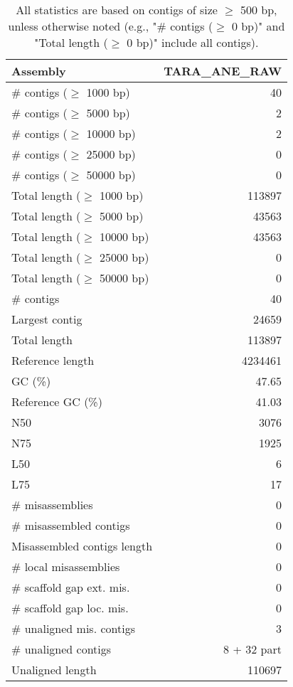 \documentclass[12pt,a4paper]{article}
\begin{document}
\begin{table}[ht]
\begin{center}
\caption{All statistics are based on contigs of size $\geq$ 500 bp, unless otherwise noted (e.g., "\# contigs ($\geq$ 0 bp)" and "Total length ($\geq$ 0 bp)" include all contigs).}
\begin{tabular}{|l*{1}{|r}|}
\hline
Assembly & TARA\_ANE\_RAW \\ \hline
\# contigs ($\geq$ 1000 bp) & 40 \\ \hline
\# contigs ($\geq$ 5000 bp) & 2 \\ \hline
\# contigs ($\geq$ 10000 bp) & 2 \\ \hline
\# contigs ($\geq$ 25000 bp) & 0 \\ \hline
\# contigs ($\geq$ 50000 bp) & 0 \\ \hline
Total length ($\geq$ 1000 bp) & 113897 \\ \hline
Total length ($\geq$ 5000 bp) & 43563 \\ \hline
Total length ($\geq$ 10000 bp) & 43563 \\ \hline
Total length ($\geq$ 25000 bp) & 0 \\ \hline
Total length ($\geq$ 50000 bp) & 0 \\ \hline
\# contigs & 40 \\ \hline
Largest contig & 24659 \\ \hline
Total length & 113897 \\ \hline
Reference length & 4234461 \\ \hline
GC (\%) & 47.65 \\ \hline
Reference GC (\%) & 41.03 \\ \hline
N50 & 3076 \\ \hline
N75 & 1925 \\ \hline
L50 & 6 \\ \hline
L75 & 17 \\ \hline
\# misassemblies & 0 \\ \hline
\# misassembled contigs & 0 \\ \hline
Misassembled contigs length & 0 \\ \hline
\# local misassemblies & 0 \\ \hline
\# scaffold gap ext. mis. & 0 \\ \hline
\# scaffold gap loc. mis. & 0 \\ \hline
\# unaligned mis. contigs & 3 \\ \hline
\# unaligned contigs & 8 + 32 part \\ \hline
Unaligned length & 110697 \\ \hline

\end{tabular}
\end{center}
\end{table}
\end{document}
